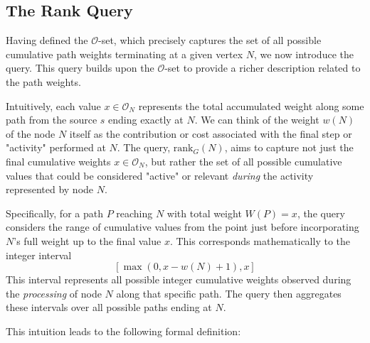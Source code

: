 \begin{example}[$\mathcal{O}$-Set Calculation]
\end{example}

\subsection{The Rank Query}
\label{subsec:rank_dag_def}

Having defined the $\mathcal{O}$-set, which precisely captures the set of all possible cumulative path weights terminating at a given vertex $N$, we now introduce the \Rank{} query. This query builds upon the $\mathcal{O}$-set to provide a richer description related to the path weights.

Intuitively, each value $x \in \mathcal{O}_N$ represents the total accumulated weight along some path from the source $s$ ending exactly at $N$. We can think of the weight $w(N)$ of the node $N$ itself as the contribution or cost associated with the final step or "activity" performed at $N$. The \Rank{} query, $\mathrm{rank}_G(N)$, aims to capture not just the final cumulative weights $x \in \mathcal{O}_N$, but rather the set of all possible cumulative values that could be considered "active" or relevant \emph{during} the activity represented by node $N$.

Specifically, for a path $P$ reaching $N$ with total weight $W(P)=x$, the query considers the range of cumulative values from the point just before incorporating $N$'s full weight up to the final value $x$. This corresponds mathematically to the integer interval
\[[\max(0, x - w(N) + 1), x]\]
This interval represents all possible integer cumulative weights observed during the \emph{processing} of node $N$ along that specific path. The \Rank{} query then aggregates these intervals over all possible paths ending at $N$.

This intuition leads to the following formal definition:

